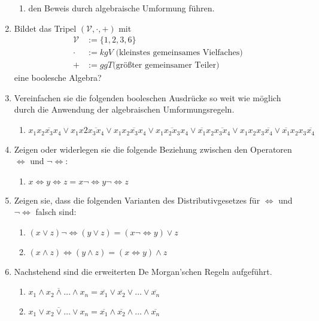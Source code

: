 \documentclass[paper=a4,fontsize=11pt]{scrartcl}%
\numberwithin{equation}{section}
\begin{document}
\begin{enumerate}
\begin{enumerate}
		\item den Beweis durch algebraische Umformung führen.
	\end{enumerate}
	\item Bildet das Tripel $( \mathcal{V}, \cdot, +)$ mit
	\begin{align*}
		\mathcal{V} & := \{1,2,3,6\}\\
		\cdot 		& := kgV \text{ (kleinstes gemeinsames Vielfaches)}\\
		+ 			& := ggT \text{(größter gemeinsamer Teiler)}
	\end{align*}	
	eine boolesche Algebra?
	\item Vereinfachen sie die folgenden booleschen Ausdrücke so weit wie möglich durch die Anwendung der algebraischen Umformungsregeln.
	\begin{enumerate}
		\item $ x_1 \overline{x_2 x_3 x_4} \lor x_1 x2 \overline{x_3 x_4} \lor x_1 x_2 \overline{x_3} x_4 \lor x_1 \overline{x_2 x_3} x_4 \lor \overline{x_1} x_2 \overline{x_3 x_4} \lor x_1 x_2 x_3 \overline{x_4} \lor \overline{x_1} x_2 x_3 \overline{x_4}$
	\end{enumerate}
	\item Zeigen oder widerlegen sie die folgende Beziehung zwischen den Operatoren $\Leftrightarrow$ und $\neg \Leftrightarrow$:
	\begin{enumerate}
		\item $x \Leftrightarrow y \Leftrightarrow z = x \neg \Leftrightarrow y \neg \Leftrightarrow z$
	\end{enumerate}
	\item Zeigen sie, dass die folgenden Varianten des Distributivgesetzes für $\Leftrightarrow$ und $\neg \Leftrightarrow$ falsch sind:
	\begin{enumerate}[resume]
		\item $(x \lor z) \neg \Leftrightarrow (y \lor z) = (x \neg \Leftrightarrow y) \lor z$
		\item $(x \land z) \Leftrightarrow (y \land z) = (x \Leftrightarrow y) \land z$
	\end{enumerate}
	\item Nachstehend sind die erweiterten De Morgan'schen Regeln aufgeführt.
	\begin{enumerate}
		\item $\overline{x_1 \land x_2 \land \ldots \land x_n} = \overline{x_1} \lor \overline{x_2} \lor \ldots \lor \overline{x_n}$
		\item $\overline{x_1 \lor x_2 \lor \ldots \lor x_n} = \overline{x_1} \land \overline{x_2} \land \ldots \land \overline{x_n}$

\end{enumerate}
\end{enumerate}
\end{document}
